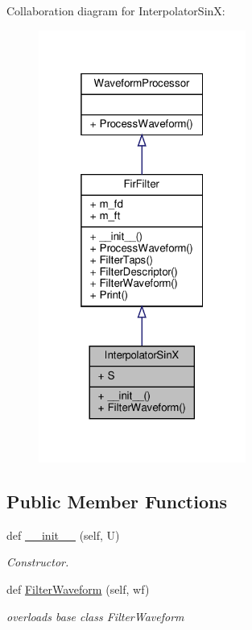 Collaboration diagram for Interpolator\+SinX\+:\nopagebreak
\begin{figure}[H]
\begin{center}
\leavevmode
\includegraphics[width=193pt]{classSignalIntegrity_1_1TimeDomain_1_1Filters_1_1InterpolatorSinX_1_1InterpolatorSinX__coll__graph}
\end{center}
\end{figure}
\subsection*{Public Member Functions}
\begin{DoxyCompactItemize}
\item 
def \hyperlink{classSignalIntegrity_1_1TimeDomain_1_1Filters_1_1InterpolatorSinX_1_1InterpolatorSinX_abff7619574bd23d3249b999fcc5bc87b}{\+\_\+\+\_\+init\+\_\+\+\_\+} (self, U)
\begin{DoxyCompactList}\small\item\em Constructor. \end{DoxyCompactList}\item 
def \hyperlink{classSignalIntegrity_1_1TimeDomain_1_1Filters_1_1InterpolatorSinX_1_1InterpolatorSinX_a84e73c18250ca4a61482f94ad61e735b}{Filter\+Waveform} (self, wf)
\begin{DoxyCompactList}\small\item\em overloads base class Filter\+Waveform \end{DoxyCompactList}\end{DoxyCompactItemize}


